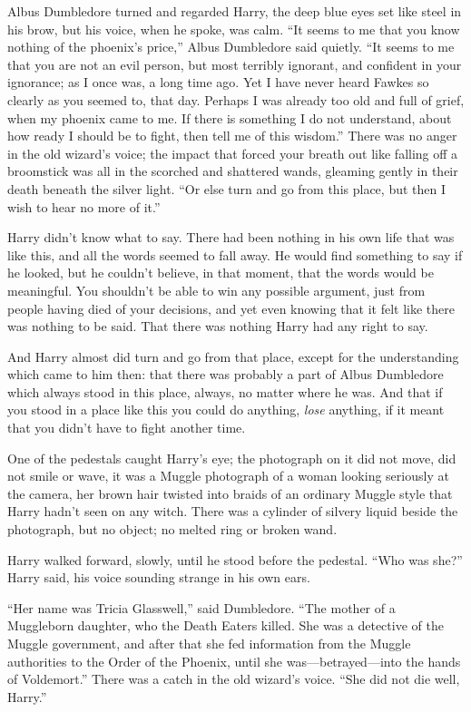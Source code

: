 Albus Dumbledore turned and regarded Harry, the deep blue eyes set like steel
in his brow, but his voice, when he spoke, was calm. “It seems to me that you
know nothing of the phoenix’s price,” Albus Dumbledore said quietly. “It seems
to me that you are not an evil person, but most terribly ignorant, and
confident in your ignorance; as I once was, a long time ago. Yet I have never
heard Fawkes so clearly as you seemed to, that day. Perhaps I was already too
old and full of grief, when my phoenix came to me. If there is something I do
not understand, about how ready I should be to fight, then tell me of this
wisdom.” There was no anger in the old wizard’s voice; the impact that forced
your breath out like falling off a broomstick was all in the scorched and
shattered wands, gleaming gently in their death beneath the silver light. “Or
else turn and go from this place, but then I wish to hear no more of it.”

Harry didn’t know what to say. There had been nothing in his own life that was
like this, and all the words seemed to fall away. He would find something to
say if he looked, but he couldn’t believe, in that moment, that the words would
be meaningful. You shouldn’t be able to win any possible argument, just from
people having died of your decisions, and yet even knowing that it felt like
there was nothing to be said. That there was nothing Harry had any right to say.

And Harry almost did turn and go from that place, except for the understanding
which came to him then: that there was probably a part of Albus Dumbledore
which always stood in this place, always, no matter where he was. And that if
you stood in a place like this you could do anything, \emph{lose} anything, if
it meant that you didn’t have to fight another time.

One of the pedestals caught Harry’s eye; the photograph on it did not move, did
not smile or wave, it was a Muggle photograph of a woman looking seriously at
the camera, her brown hair twisted into braids of an ordinary Muggle style that
Harry hadn’t seen on any witch. There was a cylinder of silvery liquid beside
the photograph, but no object; no melted ring or broken wand.

Harry walked forward, slowly, until he stood before the pedestal. “Who was
she?” Harry said, his voice sounding strange in his own ears.

“Her name was Tricia Glasswell,” said Dumbledore. “The mother of a Muggleborn
daughter, who the Death Eaters killed. She was a detective of the Muggle
government, and after that she fed information from the Muggle authorities to
the Order of the Phoenix, until she was—betrayed—into the hands of
Voldemort.” There was a catch in the old wizard’s voice. “She did not die well,
Harry.”

